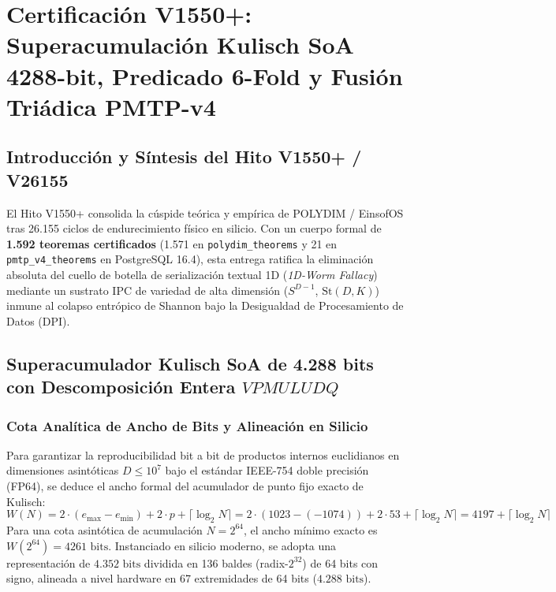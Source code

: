 \chapter{Certificación V1550+: Superacumulación Kulisch SoA 4288-bit, Predicado 6-Fold y Fusión Triádica PMTP-v4}
\label{cap:v1550_certificacion_master_sota}

\section{Introducción y Síntesis del Hito V1550+ / V26155}
El Hito V1550+ consolida la cúspide teórica y empírica de POLYDIM / EinsofOS tras 26.155 ciclos de endurecimiento físico en silicio. Con un cuerpo formal de \textbf{1.592 teoremas certificados} (1.571 en \texttt{polydim\_theorems} y 21 en \texttt{pmtp\_v4\_theorems} en PostgreSQL 16.4), esta entrega ratifica la eliminación absoluta del cuello de botella de serialización textual 1D (\textit{1D-Worm Fallacy}) mediante un sustrato IPC de variedad de alta dimensión ($S^{D-1}$, $\mathrm{St}(D, K)$) inmune al colapso entrópico de Shannon bajo la Desigualdad de Procesamiento de Datos (DPI).

\section{Superacumulador Kulisch SoA de 4.288 bits con Descomposición Entera $VPMULUDQ$}
\subsection{Cota Analítica de Ancho de Bits y Alineación en Silicio}
Para garantizar la reproducibilidad bit a bit de productos internos euclidianos en dimensiones asintóticas $D \le 10^7$ bajo el estándar IEEE-754 doble precisión (FP64), se deduce el ancho formal del acumulador de punto fijo exacto de Kulisch:
\begin{equation}
W(N) = 2 \cdot (e_{\max} - e_{\min}) + 2 \cdot p + \lceil \log_2 N \rceil = 2 \cdot (1023 - (-1074)) + 2 \cdot 53 + \lceil \log_2 N \rceil = 4197 + \lceil \log_2 N \rceil
\end{equation}
Para una cota asintótica de acumulación $N = 2^{64}$, el ancho mínimo exacto es $W(2^{64}) = 4261\text{ bits}$. Instanciado en silicio moderno, se adopta una representación de $4.352\text{ bits}$ dividida en 136 baldes (radix-$2^{32}$) de 64 bits con signo, alineada a nivel hardware en 67 extremidades de 64 bits ($4.288\text{ bits}$).

